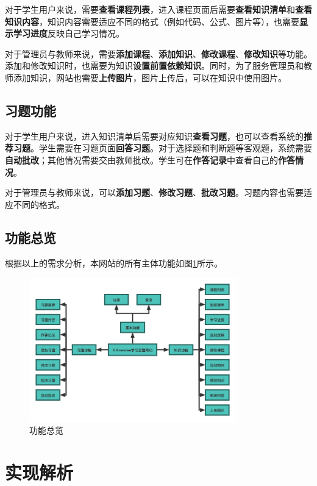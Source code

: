 \documentclass{nwafucoursepaper}
\begin{document}
对于学生用户来说，需要\textbf{查看课程列表}，进入课程页面后需要\textbf{查看知识清单}和\textbf{查看知识内容}，知识内容需要适应不同的格式（例如代码、公式、图片等），也需要\textbf{显示学习进度}反映自己学习情况。

对于管理员与教师来说，需要\textbf{添加课程}、\textbf{添加知识}、\textbf{修改课程}、\textbf{修改知识}等功能。添加和修改知识时，也需要为知识\textbf{设置前置依赖知识}。同时，为了服务管理员和教师添加知识，网站也需要\textbf{上传图片}，图片上传后，可以在知识中使用图片。

\subsection{习题功能}

对于学生用户来说，进入知识清单后需要对应知识\textbf{查看习题}，也可以查看系统的\textbf{推荐习题}。学生需要在习题页面\textbf{回答习题}。对于选择题和判断题等客观题，系统需要\textbf{自动批改}；其他情况需要交由教师批改。学生可在\textbf{作答记录}中查看自己的\textbf{作答情况}。

对于管理员与教师来说，可以\textbf{添加习题}、\textbf{修改习题}、\textbf{批改习题}。习题内容也需要适应不同的格式。

\subsection{功能总览}

根据以上的需求分析，本网站的所有主体功能如图\ref{功能总览图}所示。

\begin{figure}[htp]
  \centering
  \includegraphics[width=0.8\textwidth]{功能总览图.png}
  \caption{功能总览}
  \label{功能总览图}
\end{figure}

\section{实现解析}
\end{document}
